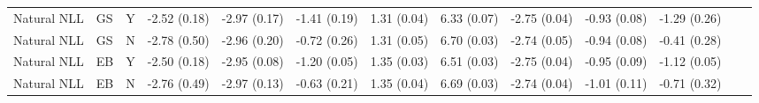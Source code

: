 \begin{table}
\begin{tabular}{|l|l|l|c|c|c|c|c|c|c|c|c|c|}
      Natural NLL &             GS &                    Y &   -2.52 (0.18) & -2.97 (0.17) & -1.41 (0.19) & 1.31 (0.04) &            6.33 (0.07) & -2.75 (0.04) &     -0.93 (0.08) & -1.29 (0.26) \\
      Natural NLL &             GS &                    N &   -2.78 (0.50) & -2.96 (0.20) & -0.72 (0.26) & 1.31 (0.05) &            6.70 (0.03) & -2.74 (0.05) &     -0.94 (0.08) & -0.41 (0.28) \\
      Natural NLL &             EB &                    Y &   -2.50 (0.18) & -2.95 (0.08) & -1.20 (0.05) & 1.35 (0.03) &            6.51 (0.03) & -2.75 (0.04) &     -0.95 (0.09) & -1.12 (0.05) \\
      Natural NLL &             EB &                    N &   -2.76 (0.49) & -2.97 (0.13) & -0.63 (0.21) & 1.35 (0.04) &            6.69 (0.03) & -2.74 (0.04) &     -1.01 (0.11) & -0.71 (0.32) \\
\bottomrule
\end{tabular}
\end{table}
